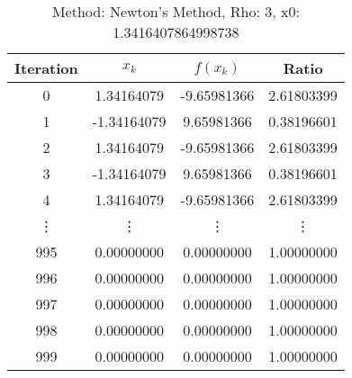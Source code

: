 \begin{table}
\centering
\caption{Method: Newton's Method, Rho: 3, x0: 1.3416407864998738}
\label{tab:table_Newton's_Method_3_1_3416407864998738}
\begin{tabular}{c c c c}
\toprule
Iteration &       $x_k$ &    $f(x_k)$ &      Ratio \\
\midrule
        0 &  1.34164079 & -9.65981366 & 2.61803399 \\
        1 & -1.34164079 &  9.65981366 & 0.38196601 \\
        2 &  1.34164079 & -9.65981366 & 2.61803399 \\
        3 & -1.34164079 &  9.65981366 & 0.38196601 \\
        4 &  1.34164079 & -9.65981366 & 2.61803399 \\
   \vdots &      \vdots &      \vdots &     \vdots \\
      995 &  0.00000000 &  0.00000000 & 1.00000000 \\
      996 &  0.00000000 &  0.00000000 & 1.00000000 \\
      997 &  0.00000000 &  0.00000000 & 1.00000000 \\
      998 &  0.00000000 &  0.00000000 & 1.00000000 \\
      999 &  0.00000000 &  0.00000000 & 1.00000000 \\
\bottomrule
\end{tabular}
\end{table}
